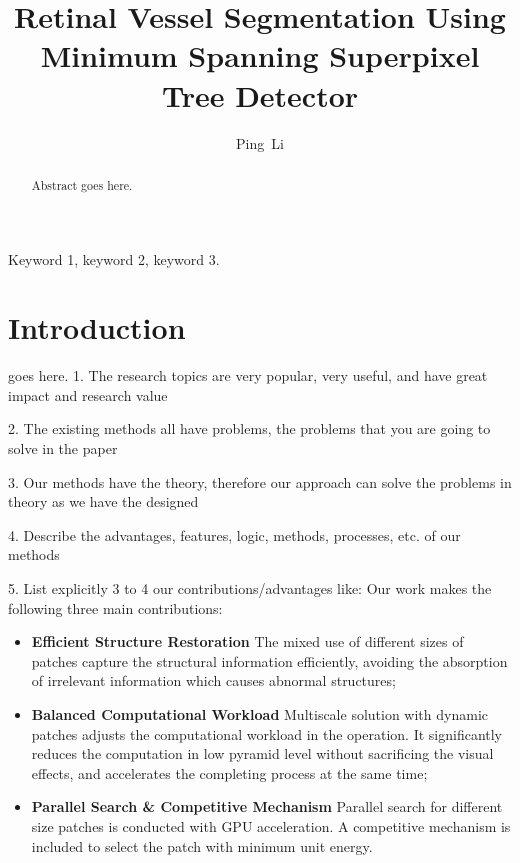 \documentclass[journal]{IEEEtran}
\begin{document}
\title{Retinal Vessel Segmentation Using Minimum Spanning Superpixel Tree Detector}

\author{
Ping~Li
}

\maketitle

\begin{abstract}
Abstract goes here.
\end{abstract}

\begin{IEEEkeywords}
Keyword 1, keyword 2, keyword 3.
\end{IEEEkeywords}

\IEEEpeerreviewmaketitle

\section{Introduction}

 goes here. 1. The research topics are very popular, very useful, and have great impact and research value

2. The existing methods all have problems, the problems that you are going to solve in the paper

3. Our methods have the theory, therefore our approach can solve the problems in theory as we have the designed

4. Describe the advantages, features, logic, methods, processes, etc. of our methods
 
5. List explicitly 3 to 4 our contributions/advantages like:
Our work makes the following three main contributions:
\begin{itemize}
\item \textbf{Efficient Structure Restoration} The mixed use of different sizes of patches capture the structural information efficiently, avoiding the absorption of irrelevant information which causes abnormal structures;
\item \textbf{Balanced Computational Workload} Multiscale solution with dynamic patches adjusts the computational workload in the operation. It significantly reduces the computation in low pyramid level without sacrificing the visual effects, and accelerates the completing process at the same time;
\item \textbf{Parallel Search \& Competitive Mechanism} Parallel search for different size patches is conducted with GPU acceleration. A competitive mechanism is included to select the patch with minimum unit energy.
\end{itemize}
\end{document}
